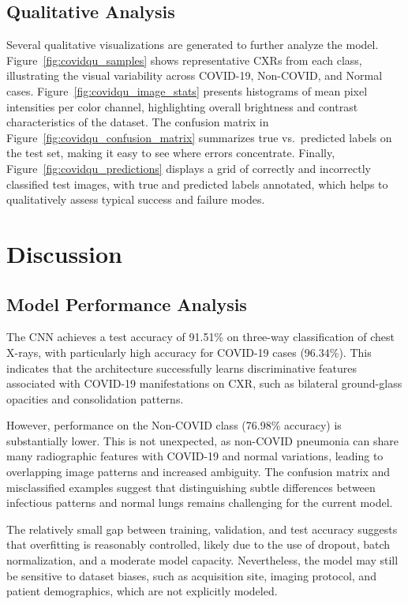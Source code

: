 \documentclass[conference]{IEEEtran}
\begin{document}
\subsection{Qualitative Analysis}

Several qualitative visualizations are generated to further analyze the model. Figure~\ref{fig:covidqu_samples} shows representative CXRs from each class, illustrating the visual variability across COVID-19, Non-COVID, and Normal cases. Figure~\ref{fig:covidqu_image_stats} presents histograms of mean pixel intensities per color channel, highlighting overall brightness and contrast characteristics of the dataset. The confusion matrix in Figure~\ref{fig:covidqu_confusion_matrix} summarizes true vs.\ predicted labels on the test set, making it easy to see where errors concentrate. Finally, Figure~\ref{fig:covidqu_predictions} displays a grid of correctly and incorrectly classified test images, with true and predicted labels annotated, which helps to qualitatively assess typical success and failure modes.

\section{Discussion}

\subsection{Model Performance Analysis}

The CNN achieves a test accuracy of 91.51\% on three-way classification of chest X-rays, with particularly high accuracy for COVID-19 cases (96.34\%). This indicates that the architecture successfully learns discriminative features associated with COVID-19 manifestations on CXR, such as bilateral ground-glass opacities and consolidation patterns.

However, performance on the Non-COVID class (76.98\% accuracy) is substantially lower. This is not unexpected, as non-COVID pneumonia can share many radiographic features with COVID-19 and normal variations, leading to overlapping image patterns and increased ambiguity. The confusion matrix and misclassified examples suggest that distinguishing subtle differences between infectious patterns and normal lungs remains challenging for the current model.

The relatively small gap between training, validation, and test accuracy suggests that overfitting is reasonably controlled, likely due to the use of dropout, batch normalization, and a moderate model capacity. Nevertheless, the model may still be sensitive to dataset biases, such as acquisition site, imaging protocol, and patient demographics, which are not explicitly modeled.
\end{document}
